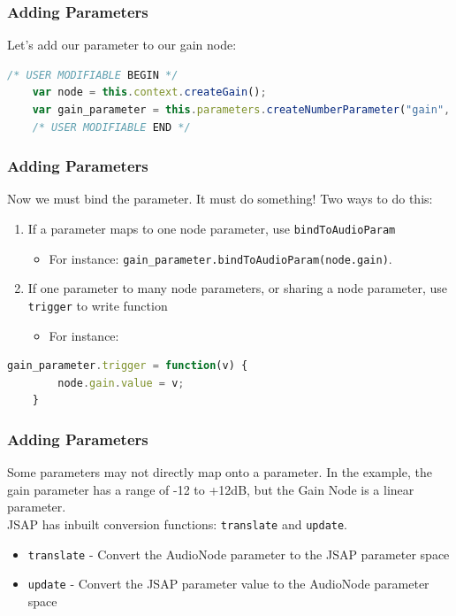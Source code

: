 \documentclass{beamer}
\begin{document}
\begin{frame}[fragile]
\frametitle{Adding Parameters}
Let's add our parameter to our gain node:
\begin{lstlisting}[language=javascript]
    /* USER MODIFIABLE BEGIN */
    var node = this.context.createGain();
    var gain_parameter = this.parameters.createNumberParameter("gain", 0, -12, 12);
    /* USER MODIFIABLE END */
\end{lstlisting}
\end{frame}

\begin{frame}[fragile]
\frametitle{Adding Parameters}
Now we must bind the parameter. It must do something! Two ways to do this:
\begin{enumerate}
\item If a parameter maps to one node parameter, use \texttt{bindToAudioParam}
\begin{itemize}
\item For instance: \texttt{gain\_parameter.bindToAudioParam(node.gain)}.
\end{itemize}
\item If one parameter to many node parameters, or sharing a node parameter, use \texttt{trigger} to write function
\begin{itemize}
\item For instance:
\end{itemize}
\end{enumerate}
\begin{lstlisting}[language=javascript]
    gain_parameter.trigger = function(v) {
        node.gain.value = v;
    }
\end{lstlisting}

\end{frame}

\begin{frame}
\frametitle{Adding Parameters}
Some parameters may not directly map onto a parameter. In the example, the gain parameter has a range of -12 to +12dB, but the Gain Node is a linear parameter.\\
JSAP has inbuilt conversion functions: \texttt{translate} and \texttt{update}.

\begin{itemize}
\item \texttt{translate} - Convert the AudioNode parameter to the JSAP parameter space
\item \texttt{update} - Convert the JSAP parameter value to the AudioNode parameter space
\end{itemize}

\end{frame}
\end{document}
